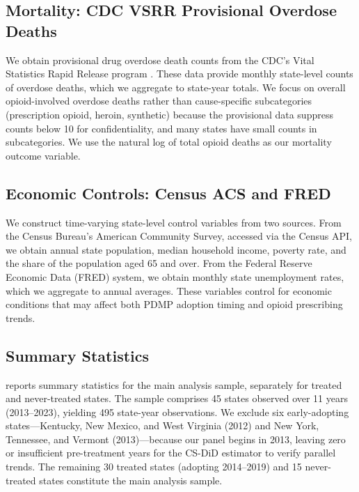 \documentclass[12pt]{article}
\begin{document}
\subsection{Mortality: CDC VSRR Provisional Overdose Deaths}\label{sec:data_cdc}

We obtain provisional drug overdose death counts from the CDC's Vital Statistics Rapid Release program \citep{cdc2022wonder}. These data provide monthly state-level counts of overdose deaths, which we aggregate to state-year totals. We focus on overall opioid-involved overdose deaths rather than cause-specific subcategories (prescription opioid, heroin, synthetic) because the provisional data suppress counts below 10 for confidentiality, and many states have small counts in subcategories. We use the natural log of total opioid deaths as our mortality outcome variable.

\subsection{Economic Controls: Census ACS and FRED}\label{sec:data_controls}

We construct time-varying state-level control variables from two sources. From the Census Bureau's American Community Survey, accessed via the Census API, we obtain annual state population, median household income, poverty rate, and the share of the population aged 65 and over. From the Federal Reserve Economic Data (FRED) system, we obtain monthly state unemployment rates, which we aggregate to annual averages. These variables control for economic conditions that may affect both PDMP adoption timing and opioid prescribing trends.

\subsection{Summary Statistics}\label{sec:data_sumstats}

 reports summary statistics for the main analysis sample, separately for treated and never-treated states. The sample comprises 45 states observed over 11 years (2013--2023), yielding 495 state-year observations. We exclude six early-adopting states---Kentucky, New Mexico, and West Virginia (2012) and New York, Tennessee, and Vermont (2013)---because our panel begins in 2013, leaving zero or insufficient pre-treatment years for the CS-DiD estimator to verify parallel trends. The remaining 30 treated states (adopting 2014--2019) and 15 never-treated states constitute the main analysis sample.
\end{document}

